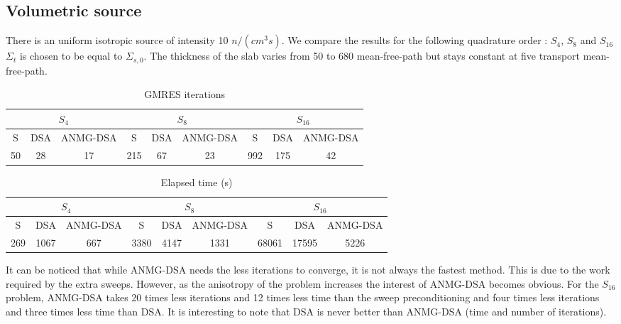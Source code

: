 \subsection{Volumetric source}
There is an uniform isotropic source of intensity 10 $n/(cm^3s)$. We compare
the results for the following quadrature order : $S_4$, $S_8$ and $S_{16}$ $\Sigma_t$
is chosen to be equal to $\Sigma_{s,0}$. The thickness of the slab varies from
50 to 680 mean-free-path but stays constant at five transport mean-free-path.
\begin{table}[H]
\begin{center}
\begin{tabular}{|c|c|c|c|c|c|c|c|c|}
\hline
\multicolumn{3}{|c|}{$S_4$} & \multicolumn{3}{c|}{$S_8$} & 
\multicolumn{3}{c|}{$S_{16}$} \\
\hline  
S & DSA & ANMG-DSA & S & DSA & ANMG-DSA & S & DSA & ANMG-DSA\\
\hline
50 & 28 & 17 & 215 & 67 & 23 & 992 & 175 & 42 \\
\hline
\end{tabular}
\caption{GMRES iterations}
\end{center}
\end{table}

\begin{table}[H]
\begin{center}
\begin{tabular}{|c|c|c|c|c|c|c|c|c|}
\hline
\multicolumn{3}{|c|}{$S_4$} & \multicolumn{3}{c|}{$S_8$} & 
\multicolumn{3}{c|}{$S_{16}$} \\
\hline  
S & DSA & ANMG-DSA & S & DSA & ANMG-DSA & S & DSA & ANMG-DSA\\
\hline
269 & 1067 & 667 & 3380 & 4147 & 1331 & 68061 & 17595 & 5226 \\
\hline
\end{tabular}
\caption{Elapsed time (s)}
\end{center}
\end{table}

It can be noticed that while ANMG-DSA needs the less iterations to converge, it is
not always the fastest method. This is due to the work required by the extra
sweeps. However, as the anisotropy of the problem increases the interest of
ANMG-DSA becomes obvious. For the $S_{16}$ problem, ANMG-DSA takes 20 times less 
iterations and 12 times less time than the sweep preconditioning and four times less
iterations and three times less time than DSA. It is interesting to note that
DSA is never better than ANMG-DSA (time and number of iterations).

